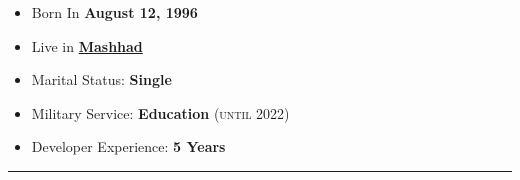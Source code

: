 \documentclass[8pt]{developercv} %
\begin{document}
\begin{minipage}[t]{0.5\textwidth} %
	\vspace{-\baselineskip} %

	\Large {
	\begin{itemize}
		\item {Born In \textbf{August 12, 1996}}
		\item {Live in
		\href{https://www.google.com/maps/place/Mashhad,+Razavi+Khorasan+Province,+Iran/@36.2976014,59.5092469,12z/data=!3m1!4b1!4m5!3m4!1s0x3f6c911abe4131d7:0xc9c57e3a9318753b!8m2!3d36.2619922!4d59.6173096}
		{\textbf{Mashhad}}}
		\item {Marital Status: \textbf{Single} }
		\item {Military Service: \textbf{Education} \normalsize{\textsc{(until 2022)}} }
		\item {Developer Experience: \textbf{ 5 Years}  }
	\end{itemize}
	}

\end{minipage}
\hfill %
\begin{minipage}[t]{0.4\textwidth} %
	\vspace{-\baselineskip} %
	\begin{barchart}{4.5}
	\end{barchart}
\end{minipage}

\begin{center}
\end{center}

\noindent\rule{\textwidth}{1pt}
\vspace{-\baselineskip} %

\vspace{3pt} %
\end{document}
